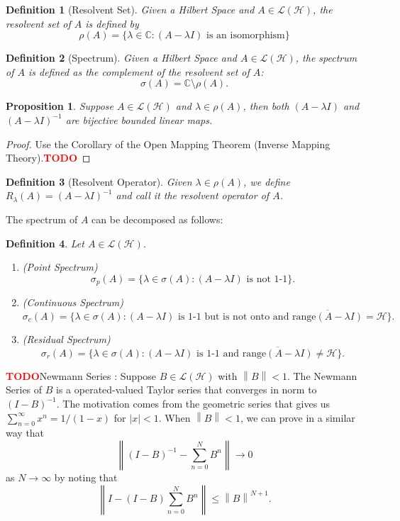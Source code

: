 \documentclass{article}
\newtheorem*{proposition}{Proposition}
\newtheorem*{definition}{Definition}
\newcommand{\C}{\mathbb{C}}
\renewcommand{\H}{\mathcal{H}}
\renewcommand{\L}{\mathcal{L}}
\newcommand{\norm}[1]{\left\lVert#1 \right\rVert}
\newcommand{\td}{\textcolor{red}{\textbf{TODO}}}
\newcommand{\range}{\text{range}}
\begin{document}
\begin{definition}[Resolvent Set]
    Given a Hilbert Space and $A \in \L(\H)$, the resolvent set of $A$ is defined by
    $$\rho(A) = \{\lambda \in \C : (A - \lambda I) \text{ is an isomorphism}\}$$
\end{definition}

\begin{definition}[Spectrum]
    Given a Hilbert Space and $A \in \L(\H)$, the spectrum of $A$ is defined as the complement of the resolvent set of $A$:
    $$\sigma(A) = \C \setminus \rho(A).$$
\end{definition}

\begin{proposition}
    Suppose $A \in \L(\H)$ and $\lambda \in \rho(A)$, then both $(A - \lambda I)$ and $(A - \lambda I)^{-1}$ are bijective bounded linear maps.
\end{proposition}

\begin{proof}
    Use the Corollary of the Open Mapping Theorem (Inverse Mapping Theory).\td 
\end{proof}

\begin{definition}[Resolvent Operator]
    Given $\lambda \in \rho(A)$, we define $R_{\lambda}(A) = (A - \lambda I)^{-1}$ and call it the resolvent operator of $A$. 
\end{definition}

The spectrum of $A$ can be decomposed as follows:

\begin{definition}
    Let $A \in \L(\H)$.
    \begin{enumerate}
        \item (Point Spectrum) $$\sigma_p(A) = \{\lambda \in \sigma(A) : (A - \lambda I) \text{ is not 1-1}\}.$$
        \item (Continuous Spectrum) $$\sigma_c(A) = \{\lambda \in \sigma(A) : (A - \lambda I) \text{ is 1-1 but is not onto and } \overline{\range(A - \lambda I)} = \H\}.$$
        \item (Residual Spectrum)
        $$\sigma_r(A) = \{\lambda \in \sigma(A) : (A - \lambda I) \text{ is 1-1 and } \overline{\range(A - \lambda I)} \neq \H\}.$$
    \end{enumerate}
\end{definition}

\td Newmann Series : Suppose $B \in \L(\H)$ with $\norm{B} < 1$. The Newmann Series of $B$ is a operated-valued Taylor series that converges in norm to $(I - B)^{-1}$. The motivation comes from the geometric series that gives us $\sum_{n=0}^{\infty}x^n = 1/(1 - x)$ for $|x| < 1$. When $\norm{B} < 1$, we can prove in a similar way that
$$\norm{(I - B)^{-1} - \sum_{n=0}^{N}B^n} \rightarrow 0$$
as $N \rightarrow \infty$ by noting that
$$\norm{I - (I - B)\sum_{n=0}^{N}B^n} \leq \norm{B}^{N+1}.$$
\end{document}
